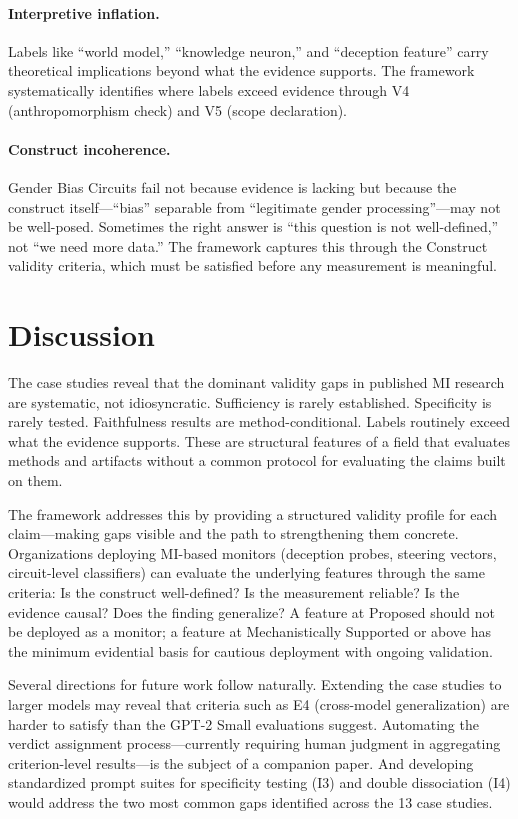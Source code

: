 \documentclass[10pt]{article}
\begin{document}
\paragraph{Interpretive inflation.} Labels like ``world model,'' ``knowledge neuron,'' and ``deception feature'' carry theoretical implications beyond what the evidence supports. The framework systematically identifies where labels exceed evidence through V4 (anthropomorphism check) and V5 (scope declaration).

\paragraph{Construct incoherence.} Gender Bias Circuits fail not because evidence is lacking but because the construct itself---``bias'' separable from ``legitimate gender processing''---may not be well-posed. Sometimes the right answer is ``this question is not well-defined,'' not ``we need more data.'' The framework captures this through the Construct validity criteria, which must be satisfied before any measurement is meaningful.

\section{Discussion}
\label{sec:discussion}

The case studies reveal that the dominant validity gaps in published MI research are systematic, not idiosyncratic. Sufficiency is rarely established. Specificity is rarely tested. Faithfulness results are method-conditional. Labels routinely exceed what the evidence supports. These are structural features of a field that evaluates methods and artifacts without a common protocol for evaluating the claims built on them.

The framework addresses this by providing a structured validity profile for each claim---making gaps visible and the path to strengthening them concrete. Organizations deploying MI-based monitors (deception probes, steering vectors, circuit-level classifiers) can evaluate the underlying features through the same criteria: Is the construct well-defined? Is the measurement reliable? Is the evidence causal? Does the finding generalize? A feature at Proposed should not be deployed as a monitor; a feature at Mechanistically Supported or above has the minimum evidential basis for cautious deployment with ongoing validation.

Several directions for future work follow naturally. Extending the case studies to larger models may reveal that criteria such as E4 (cross-model generalization) are harder to satisfy than the GPT-2 Small evaluations suggest. Automating the verdict assignment process---currently requiring human judgment in aggregating criterion-level results---is the subject of a companion paper. And developing standardized prompt suites for specificity testing (I3) and double dissociation (I4) would address the two most common gaps identified across the 13 case studies.
\end{document}
